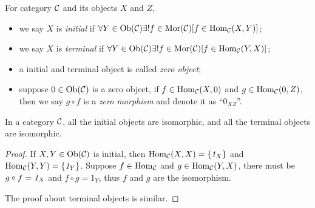 \documentclass{article}
\begin{document}
\begin{defi}
	For category $\mathcal{C}$ and its objects $X$ and $Z$,
	\begin{itemize}
		\item we say $X$ is \emph{initial} if $\forall Y\in\mathrm{Ob}(\mathcal{C})\exists!f\in\mathrm{Mor}(\mathcal{C})[f\in\mathrm{Hom}_{\mathcal{C}}(X,Y)]$;
		\item we say $X$ is \emph{terminal} if $\forall Y\in\mathrm{Ob}(\mathcal{C})\exists!f\in\mathrm{Mor}(\mathcal{C})[f\in\mathrm{Hom}_{\mathcal{C}}(Y,X)]$;
		\item a initial and terminal object is called \emph{zero object};
		\item suppose $0\in\mathrm{Ob}(\mathcal{C})$ is a zero object, if $f\in\mathrm{Hom}_{\mathcal{C}}(X,0)$ and $g\in\mathrm{Hom}_{\mathcal{C}}(0,Z)$, then we say $g\circ f$ is a \emph{zero morphism} and denote it as ``$0_{XZ}$''.
	\end{itemize}
\end{defi}


\begin{cor}
	In a category $\mathcal{C}$, all the initial objects are isomorphic, and all the terminal objects are isomorphic.
\end{cor}

\begin{proof}
	If $X,Y\in\mathrm{Ob}(\mathcal{C})$ is initial, then $\mathrm{Hom}_{\mathcal{C}}(X,X)=\{\mathit{1}_X\}$ and $\mathrm{Hom}_{\mathcal{C}}(Y,Y)=\{\mathit{1}_Y\}$. Suppose $f\in\mathrm{Hom}_{\mathcal{C}}$ and $g\in\mathrm{Hom}_{\mathcal{C}}(Y,X)$, there must be $g\circ f=\mathit{1}_X$ and $f\circ g=1_Y$, thus $f$ and $g$ are the isomorphism.
	
	The proof about terminal objects is similar.
\end{proof}
\end{document}
